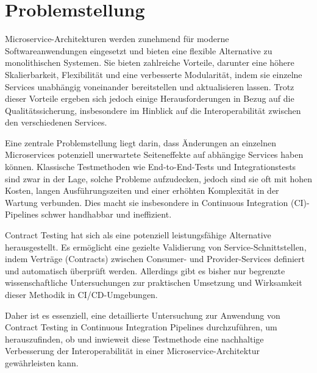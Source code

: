 \chapter{Problemstellung}\label{ch:intro}

Microservice-Architekturen werden zunehmend für moderne Softwareanwendungen eingesetzt und bieten eine flexible Alternative zu monolithischen Systemen.
Sie bieten zahlreiche Vorteile, darunter eine höhere Skalierbarkeit, Flexibilität und eine verbesserte Modularität, indem sie einzelne Services unabhängig voneinander bereitstellen und aktualisieren lassen.
Trotz dieser Vorteile ergeben sich jedoch einige Herausforderungen in Bezug auf die Qualitätssicherung, insbesondere im Hinblick auf die Interoperabilität zwischen den verschiedenen Services.

Eine zentrale Problemstellung liegt darin, dass Änderungen an einzelnen Microservices potenziell unerwartete Seiteneffekte auf abhängige Services haben können.
Klassische Testmethoden wie End-to-End-Tests und Integrationstests sind zwar in der Lage, solche Probleme aufzudecken, jedoch sind sie oft mit hohen Kosten, langen Ausführungszeiten und einer erhöhten Komplexität in der Wartung verbunden.
Dies macht sie insbesondere in Continuous Integration (CI)-Pipelines schwer handhabbar und ineffizient.

Contract Testing hat sich als eine potenziell leistungsfähige Alternative herausgestellt.
Es ermöglicht eine gezielte Validierung von Service-Schnittstellen, indem Verträge (Contracts) zwischen Consumer- und Provider-Services definiert und automatisch überprüft werden.
Allerdings gibt es bisher nur begrenzte wissenschaftliche Untersuchungen zur praktischen Umsetzung und Wirksamkeit dieser Methodik in CI/CD-Umgebungen.

Daher ist es essenziell, eine detaillierte Untersuchung zur Anwendung von Contract Testing in Continuous Integration Pipelines durchzuführen, um herauszufinden, ob und inwieweit diese Testmethode eine nachhaltige Verbesserung der Interoperabilität in einer Microservice-Architektur gewährleisten kann.

